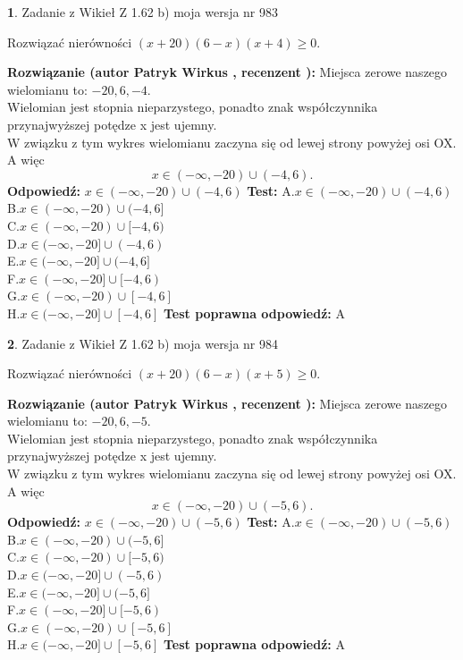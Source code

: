 \documentclass[12pt, a4paper]{article}
\theoremstyle{definition} %
\newtheorem{zad}{}
\newcommand{\zadStart}[1]{\begin{zad}#1\newline}
\newcommand{\zadStop}{\end{zad}}
\newcommand{\rozwStart}[2]{\noindent \textbf{Rozwiązanie (autor #1 , recenzent #2): }\newline}
\newcommand{\rozwStop}{\newline}
\newcommand{\odpStart}{\noindent \textbf{Odpowiedź:}\newline}
\newcommand{\odpStop}{\newline}
\newcommand{\testStart}{\noindent \textbf{Test:}\newline}
\newcommand{\testStop}{\newline}
\newcommand{\kluczStart}{\noindent \textbf{Test poprawna odpowiedź:}\newline}
\newcommand{\kluczStop}{\newline}
\begin{document}
\zadStart{Zadanie z Wikieł Z 1.62 b) moja wersja nr 983}

Rozwiązać nierówności $(x+20)(6-x)(x+4)\ge0$.
\zadStop
\rozwStart{Patryk Wirkus}{}
Miejsca zerowe naszego wielomianu to: $-20, 6, -4$.\\
Wielomian jest stopnia nieparzystego, ponadto znak współczynnika przy\linebreak najwyższej potędze x jest ujemny.\\ W związku z tym wykres wielomianu zaczyna się od lewej strony powyżej osi OX. A więc $$x \in (-\infty,-20) \cup (-4,6).$$
\rozwStop
\odpStart
$x \in (-\infty,-20) \cup (-4,6)$
\odpStop
\testStart
A.$x \in (-\infty,-20) \cup (-4,6)$\\
B.$x \in (-\infty,-20) \cup (-4,6]$\\
C.$x \in (-\infty,-20) \cup [-4,6)$\\
D.$x \in (-\infty,-20] \cup (-4,6)$\\
E.$x \in (-\infty,-20] \cup (-4,6]$\\
F.$x \in (-\infty,-20] \cup [-4,6)$\\
G.$x \in (-\infty,-20) \cup [-4,6]$\\
H.$x \in (-\infty,-20] \cup [-4,6]$
\testStop
\kluczStart
A
\kluczStop



\zadStart{Zadanie z Wikieł Z 1.62 b) moja wersja nr 984}

Rozwiązać nierówności $(x+20)(6-x)(x+5)\ge0$.
\zadStop
\rozwStart{Patryk Wirkus}{}
Miejsca zerowe naszego wielomianu to: $-20, 6, -5$.\\
Wielomian jest stopnia nieparzystego, ponadto znak współczynnika przy\linebreak najwyższej potędze x jest ujemny.\\ W związku z tym wykres wielomianu zaczyna się od lewej strony powyżej osi OX. A więc $$x \in (-\infty,-20) \cup (-5,6).$$
\rozwStop
\odpStart
$x \in (-\infty,-20) \cup (-5,6)$
\odpStop
\testStart
A.$x \in (-\infty,-20) \cup (-5,6)$\\
B.$x \in (-\infty,-20) \cup (-5,6]$\\
C.$x \in (-\infty,-20) \cup [-5,6)$\\
D.$x \in (-\infty,-20] \cup (-5,6)$\\
E.$x \in (-\infty,-20] \cup (-5,6]$\\
F.$x \in (-\infty,-20] \cup [-5,6)$\\
G.$x \in (-\infty,-20) \cup [-5,6]$\\
H.$x \in (-\infty,-20] \cup [-5,6]$
\testStop
\kluczStart
A
\kluczStop
\end{document}
